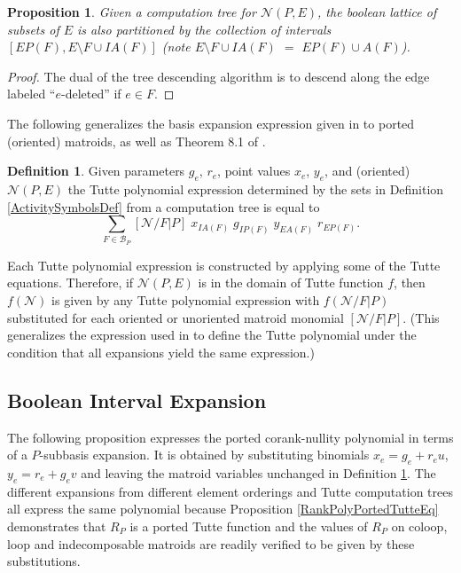 \documentclass[12pt]{article}
\newtheorem{proposition}[theorem]{Proposition}
\theoremstyle{definition}
\newtheorem{definition}[theorem]{Definition}
\begin{document}
\begin{proposition}
\label{DualPartitionProposition}
Given a computation tree for
$\mathcal{N}(P,E)$, 
the boolean lattice of subsets of $E$
is also partitioned by the collection of
intervals $[EP(F),E\setminus F\cup IA(F)]$ 
(note $E\setminus F\cup IA(F)$ $=$ $EP(F)\cup A(F)$).
\end{proposition}
\begin{proof} The dual of the tree descending algorithm is to descend along
the edge labeled ``$e$-deleted'' if $e\in F$.
\end{proof}




The following generalizes the basis expansion expression given
in \cite{MR93a:05047} to ported (oriented) matroids, as well as 
Theorem 8.1 of \cite{SetPointedLV}.

\begin{definition}
\label{TuttePolyExpression}
Given parameters $g_e$, $r_e$, point values $x_e$, $y_e$, and 
(oriented) $\mathcal{N}(P,E)$
the Tutte polynomial expression
determined by the sets in Definition 
\ref{ActivitySymbolsDef} 
from a computation tree is 
equal to
\begin{equation}
\sum_{F\in \mathcal{B}_P}[\mathcal{N}/F|P]
\;x_{IA(F)}\;g_{IP(F)}\;y_{EA(F)}\;r_{EP(F)}.
\end{equation}
\end{definition}

Each Tutte polynomial expression is constructed by applying some of the
Tutte equations.  Therefore, if $\mathcal{N}(P,E)$ is in the domain of
Tutte function $f$, then $f(\mathcal{N})$ is given by any Tutte polynomial
expression with $f(\mathcal{N}/F|P)$ substituted for each oriented or 
unoriented matroid monomial $[\mathcal{N}/F|P]$.  (This generalizes the 
expression used in \cite{MR93a:05047} to define the Tutte polynomial under
the condition that all expansions yield the same expression.)


\subsection{Boolean Interval Expansion}

The following proposition 
expresses the ported corank-nullity polynomial
in terms of a $P$-subbasis expansion.  It is obtained by substituting
binomials $x_e=g_e+r_eu$, $y_e=r_e+g_ev$ and leaving
the matroid variables unchanged
in Definition
\ref{TuttePolyExpression}.  The different expansions from
different element orderings and Tutte computation trees all 
express the same polynomial because Proposition
\ref{RankPolyPortedTutteEq} demonstrates that $R_P$ is a ported
Tutte function and the values of $R_P$ on coloop, loop and
indecomposable matroids are readily verified to be given
by these substitutions.  
\end{document}
